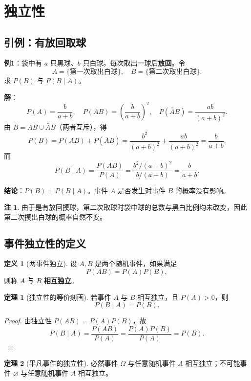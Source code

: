 \documentclass[11pt,a4paper]{report}
\theoremstyle{definition}
\newtheorem{definition}{定义}[chapter]
\newtheorem{note}{注}[chapter]
\newtheorem{theorem}{定理}[chapter]
\begin{document}
\section{独立性}

\subsection{引例：有放回取球}

\textbf{例1}：袋中有 $a$ 只黑球、$b$ 只白球。每次取出一球后\textbf{放回}。令
\[
A = \{\text{第一次取出白球}\}, \quad B = \{\text{第二次取出白球}\}.
\]
求 $P(B)$ 与 $P(B \mid A)$。

\textbf{解}：
\[
P(A) = \frac{b}{a+b}, \quad P(AB) = \left(\frac{b}{a+b}\right)^2, \quad P(\bar{A}B) = \frac{ab}{(a+b)^2}.
\]
由 $B = AB \cup \bar{A}B$（两者互斥），得
\[
P(B) = P(AB) + P(\bar{A}B) = \frac{b^2}{(a+b)^2} + \frac{ab}{(a+b)^2} = \frac{b}{a+b}.
\]
而
\[
P(B \mid A) = \frac{P(AB)}{P(A)} = \frac{b^2/(a+b)^2}{b/(a+b)} = \frac{b}{a+b}.
\]

\textbf{结论}：$P(B) = P(B \mid A)$。事件 $A$ 是否发生对事件 $B$ 的概率没有影响。

\begin{note}
由于是有放回摸球，第二次取球时袋中球的总数与黑白比例均未改变，因此第二次摸出白球的概率自然不变。
\end{note}

\subsection{事件独立性的定义}

\begin{definition}[两事件独立]
设 $A, B$ 是两个随机事件，如果满足
\[
\boxed{P(AB) = P(A)P(B)},
\]
则称 $A$ 与 $B$ \textbf{相互独立}。
\end{definition}

\begin{theorem}[独立性的等价刻画]
若事件 $A$ 与 $B$ 相互独立，且 $P(A) > 0$，则
\[
P(B \mid A) = P(B).
\]
\end{theorem}

\begin{proof}
由独立性 $P(AB) = P(A)P(B)$，故
\[
P(B \mid A) = \frac{P(AB)}{P(A)} = \frac{P(A)P(B)}{P(A)} = P(B).
\]
\end{proof}

\begin{theorem}[平凡事件的独立性]
必然事件 $\Omega$ 与任意随机事件 $A$ 相互独立；不可能事件 $\varnothing$ 与任意随机事件 $A$ 相互独立。
\end{theorem}
\end{document}
